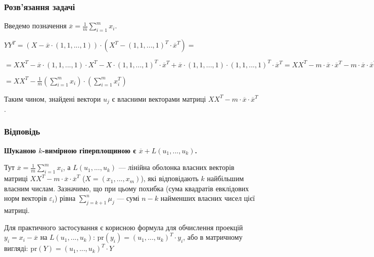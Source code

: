 \documentclass[10pt,pdf]{beamer}
\begin{document}
    \begin{frame}
        \frametitle{Розв'язання задачі}
        Введемо позначення $\overline{x} = \frac{1}{m} \sum\limits_{i=1}^m x_i$.

        $Y Y^T = \left(X -  \overline{x}\cdot (1, 1, ..., 1)\right) \cdot
        \left(X^T - (1, 1, ..., 1)^T \cdot \overline{x}^T \right) = $

        $ = X X^T - \overline{x}\cdot (1, 1, ..., 1) \cdot X^T - 
        X \cdot (1, 1, ..., 1)^T \cdot \overline{x}^T + 
        \overline{x} \cdot (1, 1, ..., 1) \cdot (1, 1, ..., 1)^T \cdot \overline{x}^T
         = X X^T - m \cdot \overline{x} \cdot \overline{x}^T - m \cdot \overline{x} \cdot \overline{x}^T
         + m \cdot \overline{x} \cdot \overline{x}^T = X X^T - m \cdot \overline{x} \cdot \overline{x}^T= $

        $ = X X^T - \frac{1}{m} \left( \sum\limits_{i=1}^m x_i\right) \cdot \left( \sum\limits_{i=1}^m x_i^T\right)$

        Таким чином, знайдені вектори $u_j$ є власними векторами матриці 
        $X X^T - m \cdot \overline{x} \cdot \overline{x}^T$.
    \end{frame}
    \begin{frame}
        \frametitle{Відповідь}
        \textbf{Шуканою $k$-вимірною гіперплощиною є $\overline{x} + L(u_1, ..., u_k)$.}

        Тут
        $\overline{x} = \frac{1}{m} \sum\limits_{i=1}^m x_i$,
        а $L(u_1, ..., u_k)$ --- лінійна оболонка власних векторів матриці
        $X X^T - m \cdot \overline{x} \cdot \overline{x}^T$ ($X = ({x_1}, ..., {x_m})$),
        які відповідають $k$ найбільшим власним числам. 
        Зазначимо, що при цьому похибка (сума квадратів евклідових норм векторів $\varepsilon_i$)
        рівна $\sum\limits_{j=k+1}^n \mu_j$ --- сумі $n-k$ найменших власних чисел цієї матриці.

        Для практичного застосування є корисною формула для
        обчислення проекцій $y_i = x_i - \overline{x}$ на $L(u_1, ..., u_k)$:
        $\mathrm{pr} (y_i) = (u_1, ..., u_k)^T \cdot y_i$, або в матричному вигляді:
        $\mathrm{pr} (Y) = (u_1, ..., u_k)^T \cdot Y$
    \end{frame}
\end{document}
